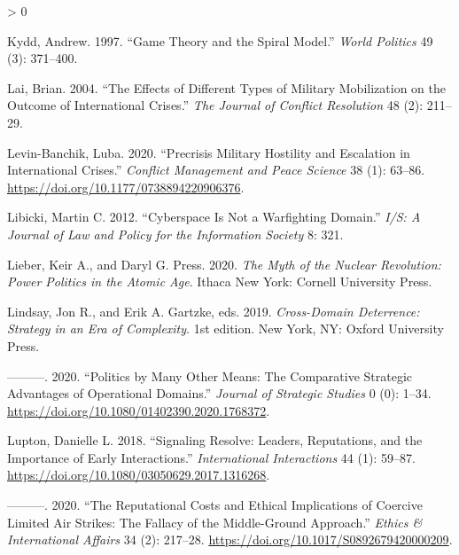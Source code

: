 \documentclass[
]{article}
\newlength{\cslhangindent}
\newenvironment{CSLReferences}[2] %
 {%
  \setlength{\parindent}{0pt}
  \ifodd #1 \everypar{\setlength{\hangindent}{\cslhangindent}}\ignorespaces\fi
  \ifnum #2 > 0
  \setlength{\parskip}{#2\baselineskip}
  \fi
 }%
 {}
\begin{document}
\begin{CSLReferences}{1}{0}
\leavevmode\hypertarget{ref-kydd_gametheoryspiral_1997}{}%
Kydd, Andrew. 1997. {``Game {Theory} and the {Spiral Model}.''} \emph{World Politics} 49 (3): 371--400.

\leavevmode\hypertarget{ref-lai_effectsdifferenttypes_2004}{}%
Lai, Brian. 2004. {``The {Effects} of {Different Types} of {Military Mobilization} on the {Outcome} of {International Crises}.''} \emph{The Journal of Conflict Resolution} 48 (2): 211--29.

\leavevmode\hypertarget{ref-levin-banchik_precrisismilitaryhostility_2020}{}%
Levin-Banchik, Luba. 2020. {``Precrisis Military Hostility and Escalation in International Crises.''} \emph{Conflict Management and Peace Science} 38 (1): 63--86. \url{https://doi.org/10.1177/0738894220906376}.

\leavevmode\hypertarget{ref-libicki_cyberspacenotwarfighting_2012}{}%
Libicki, Martin C. 2012. {``Cyberspace {Is Not} a {Warfighting Domain}.''} \emph{I/S: A Journal of Law and Policy for the Information Society} 8: 321.

\leavevmode\hypertarget{ref-lieber_mythnuclearrevolution_2020}{}%
Lieber, Keir A., and Daryl G. Press. 2020. \emph{The {Myth} of the {Nuclear Revolution}: {Power Politics} in the {Atomic Age}}. {Ithaca New York}: {Cornell University Press}.

\leavevmode\hypertarget{ref-lindsay_crossdomaindeterrencestrategy_2019}{}%
Lindsay, Jon R., and Erik A. Gartzke, eds. 2019. \emph{Cross-Domain Deterrence: Strategy in an Era of Complexity}. 1st edition. {New York, NY}: {Oxford University Press}.

\leavevmode\hypertarget{ref-lindsay_politicsmanyother_2020}{}%
---------. 2020. {``Politics by Many Other Means: {The} Comparative Strategic Advantages of Operational Domains.''} \emph{Journal of Strategic Studies} 0 (0): 1--34. \url{https://doi.org/10.1080/01402390.2020.1768372}.

\leavevmode\hypertarget{ref-lupton_signalingresolveleaders_2018}{}%
Lupton, Danielle L. 2018. {``Signaling {Resolve}: {Leaders}, {Reputations}, and the {Importance} of {Early Interactions}.''} \emph{International Interactions} 44 (1): 59--87. \url{https://doi.org/10.1080/03050629.2017.1316268}.

\leavevmode\hypertarget{ref-lupton_reputationalcostsethical_2020}{}%
---------. 2020. {``The {Reputational Costs} and {Ethical Implications} of {Coercive Limited Air Strikes}: {The Fallacy} of the {Middle-Ground Approach}.''} \emph{Ethics \& International Affairs} 34 (2): 217--28. \url{https://doi.org/10.1017/S0892679420000209}.


\end{CSLReferences}
\end{document}

